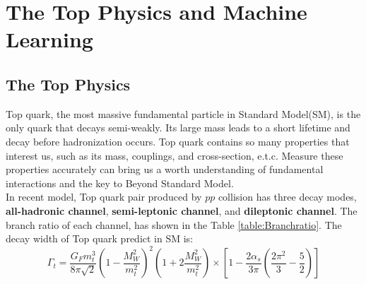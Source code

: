 
\chapter{The Top Physics and Machine Learning}

\section{The Top Physics}

Top quark, the most massive fundamental particle in Standard Model(SM), is the only quark that decays semi-weakly. Its large mass leads to a short lifetime and decay before hadronization occurs. Top quark contains so many properties that interest us, such as its mass, couplings, and cross-section, e.t.c. Measure these properties accurately can bring us a worth understanding of fundamental interactions and the key to Beyond Standard Model.\cite{Zyla:2020zbs}
\\
In recent model, Top quark pair produced by $pp$ collision has three decay modes, \textbf{all-hadronic channel}, \textbf{semi-leptonic channel}, and \textbf{dileptonic channel}. The branch ratio of each channel, has shown in the Table \ref{table:Branchratio}. The decay width of Top quark predict in SM is\cite{A.Quadt:2008TopPhysics}: 
\begin{equation}
	\Gamma_{t} = \frac{G_{F}m_{t}^{3}}{8\pi\sqrt{2}}\left(1-\frac{M_{W}^{2}}{m_{t}^{2}}\right)^{2}\left(1+2\frac{M_{W}^{2}}{m_{t}^{2}}\right)\times\left[1 - \frac{2\alpha_{s}}{3\pi}\left( \frac{2\pi^{2}}{3} - \frac{5}{2}\right) \right]
\end{equation}
\\

